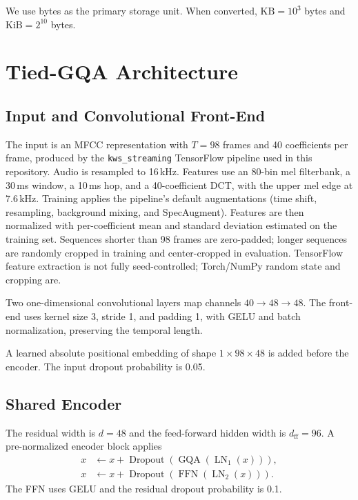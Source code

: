 \documentclass[journal]{IEEEtran}
\begin{document}
We use bytes as the primary storage unit.
When converted, $\mathrm{KB}=10^3$ bytes and
$\mathrm{KiB}=2^{10}$ bytes.

\section{Tied-GQA Architecture}

\subsection{Input and Convolutional Front-End}

The input is an MFCC representation with $T=98$ frames and
40 coefficients per frame, produced by the
\texttt{kws\_streaming} TensorFlow pipeline used in this
repository.
Audio is resampled to 16\,kHz.
Features use an 80-bin mel filterbank, a 30\,ms window,
a 10\,ms hop, and a 40-coefficient DCT, with the upper mel edge
at 7.6\,kHz.
Training applies the pipeline's default augmentations
(time shift, resampling, background mixing, and SpecAugment).
Features are then normalized with per-coefficient mean and
standard deviation estimated on the training set.
Sequences shorter than 98 frames are zero-padded; longer
sequences are randomly cropped in training and center-cropped
in evaluation.
TensorFlow feature extraction is not fully seed-controlled;
Torch/NumPy random state and cropping are.

Two one-dimensional convolutional layers map channels
$40\rightarrow48\rightarrow48$.
The front-end uses kernel size 3, stride 1, and padding 1,
with GELU and batch normalization, preserving the temporal length.

A learned absolute positional embedding of shape
$1\times98\times48$ is added before the encoder.
The input dropout probability is 0.05.

\subsection{Shared Encoder}

The residual width is $d=48$ and the feed-forward hidden width
is $d_{\mathrm{ff}}=96$.
A pre-normalized encoder block applies
\begin{align}
x &\leftarrow x+
\operatorname{Dropout}\!\left(
\operatorname{GQA}(\operatorname{LN}_1(x))
\right),\\
x &\leftarrow x+
\operatorname{Dropout}\!\left(
\operatorname{FFN}(\operatorname{LN}_2(x))
\right).
\end{align}
The FFN uses GELU and the residual dropout probability is 0.1.
\end{document}
